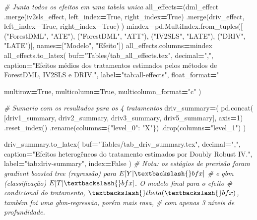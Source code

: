 \documentclass[
]{article}
\newenvironment{Shaded}{\begin{snugshade}}{\end{snugshade}}
\newcommand{\CommentTok}[1]{\textcolor[rgb]{0.56,0.35,0.01}{\textit{#1}}}
\newcommand{\DecValTok}[1]{\textcolor[rgb]{0.00,0.00,0.81}{#1}}
\newcommand{\NormalTok}[1]{#1}
\newcommand{\OperatorTok}[1]{\textcolor[rgb]{0.81,0.36,0.00}{\textbf{#1}}}
\newcommand{\SpecialCharTok}[1]{\textcolor[rgb]{0.00,0.00,0.00}{#1}}
\newcommand{\StringTok}[1]{\textcolor[rgb]{0.31,0.60,0.02}{#1}}
\newcommand{\VariableTok}[1]{\textcolor[rgb]{0.00,0.00,0.00}{#1}}
\begin{document}
\begin{Shaded}
\begin{Highlighting}[]
{{\CommentTok{# Junta todos os efeitos em uma tabela unica}
\NormalTok{all_effects}\OperatorTok{=}\NormalTok{(dml_effect}
\NormalTok{    .merge(iv2sls_effect, left_index}\OperatorTok{=}\VariableTok{True}\NormalTok{, right_index}\OperatorTok{=}\VariableTok{True}\NormalTok{)}
\NormalTok{    .merge(driv_effect, left_index}\OperatorTok{=}\VariableTok{True}\NormalTok{, right_index}\OperatorTok{=}\VariableTok{True}\NormalTok{)}
\NormalTok{)}
\NormalTok{mindex}\OperatorTok{=}\NormalTok{pd.MultiIndex.from_tuples([}
\NormalTok{    (}\StringTok{"ForestDML"}\NormalTok{, }\StringTok{"ATE"}\NormalTok{), }
\NormalTok{    (}\StringTok{"ForestDML"}\NormalTok{, }\StringTok{"ATT"}\NormalTok{), }
\NormalTok{    (}\StringTok{"IV2SLS"}\NormalTok{, }\StringTok{"LATE"}\NormalTok{), }
\NormalTok{    (}\StringTok{"DRIV"}\NormalTok{, }\StringTok{"LATE"}\NormalTok{)], }
\NormalTok{    names}\OperatorTok{=}\NormalTok{[}\StringTok{"Modelo"}\NormalTok{, }\StringTok{"Efeito"}\NormalTok{])}
\NormalTok{all_effects.columns}\OperatorTok{=}\NormalTok{mindex}
\NormalTok{all_effects.to_latex(}
\NormalTok{    buf}\OperatorTok{=}\StringTok{"Tables/tab_all_effects.tex"}\NormalTok{,}
\NormalTok{    decimal}\OperatorTok{=}\StringTok{","}\NormalTok{,}
\NormalTok{    caption}\OperatorTok{=}\StringTok{"Efeitos médios dos tratamentos estimados pelos métodos de ForestDML, IV2SLS e DRIV."}\NormalTok{,}
\NormalTok{    label}\OperatorTok{=}\StringTok{"tab:all-effects"}\NormalTok{,}
\NormalTok{    float_format}\OperatorTok{=}\StringTok{"}\SpecialCharTok{%.4f}\StringTok{"}\NormalTok{,}
\NormalTok{    multirow}\OperatorTok{=}\VariableTok{True}\NormalTok{,}
\NormalTok{    multicolumn}\OperatorTok{=}\VariableTok{True}\NormalTok{,}
\NormalTok{    multicolumn_format}\OperatorTok{=}\StringTok{"c"}
\NormalTok{)}

\CommentTok{# Sumario com os resultados para os 4 tratamentos}
\NormalTok{driv_summary}\OperatorTok{=}\NormalTok{(}
\NormalTok{    pd.concat(}
\NormalTok{        [driv1_summary, driv2_summary, driv3_summary, driv5_summary],}
\NormalTok{        axis}\OperatorTok{=}\DecValTok{1}\NormalTok{)}
\NormalTok{    .reset_index()}
\NormalTok{    .rename(columns}\OperatorTok{=}\NormalTok{\{}\StringTok{"level_0"}\NormalTok{: }\StringTok{"X"}\NormalTok{\})}
\NormalTok{    .drop(columns}\OperatorTok{=}\StringTok{"level_1"}\NormalTok{)}
\NormalTok{)}

\NormalTok{driv_summary.to_latex(}
\NormalTok{    buf}\OperatorTok{=}\StringTok{"Tables/tab_driv_summary.tex"}\NormalTok{,}
\NormalTok{    decimal}\OperatorTok{=}\StringTok{","}\NormalTok{,}
\NormalTok{    caption}\OperatorTok{=}\StringTok{"Efeitos heterogêneos do tratamento estimados por Doubly Robust IV."}\NormalTok{,}
\NormalTok{    label}\OperatorTok{=}\StringTok{"tab:driv-summary"}\NormalTok{,}
\NormalTok{    index}\OperatorTok{=}\VariableTok{False}
\NormalTok{)}
\CommentTok{# Nota: os estágios de previsão foram gradient boosted tree (regressão) para $E[Y|\textbackslash{}bfx]$}
\CommentTok{# e gbm (classificação) $E[T|\textbackslash{}bfx]$. O modelo final para o efeito }
\CommentTok{# condicional do tratamento, $\textbackslash{}theta(\textbackslash{}bfx)$, também foi uma gbm-regressão, porém mais rasa,}
\CommentTok{# com apenas 3 níveis de profundidade.}

}}}
\end{Highlighting}
\end{Shaded}
\end{document}
